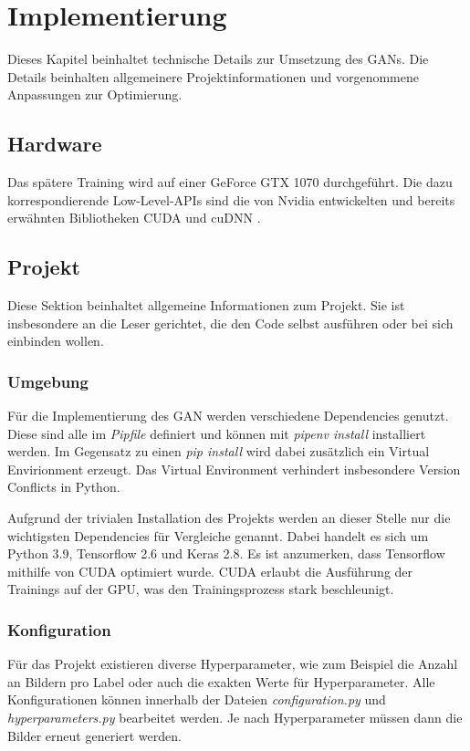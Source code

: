 
\chapter{Implementierung}
Dieses Kapitel beinhaltet technische Details zur Umsetzung des GANs.
Die Details beinhalten allgemeinere Projektinformationen und vorgenommene Anpassungen zur Optimierung.

\section{Hardware}
Das spätere Training wird auf einer GeForce GTX 1070 \cite{gtx-1070} durchgeführt.
Die dazu korrespondierende Low-Level-APIs sind die von Nvidia entwickelten und bereits erwähnten Bibliotheken CUDA \cite{cuda-doc} und cuDNN \cite{cudnn-doc}.  

\section{Projekt}
Diese Sektion beinhaltet allgemeine Informationen zum Projekt.
Sie ist insbesondere an die Leser gerichtet, die den Code selbst ausführen oder bei sich einbinden wollen.

\subsection{Umgebung}
Für die Implementierung des GAN werden verschiedene Dependencies genutzt.
Diese sind alle im \textit{Pipfile} definiert und können mit \textit{pipenv install} installiert werden.
Im Gegensatz zu einen \textit{pip install} wird dabei zusätzlich ein Virtual Envirionment erzeugt.
Das Virtual Environment verhindert insbesondere Version Conflicts in Python.
\newline

Aufgrund der trivialen Installation des Projekts werden an dieser Stelle nur die wichtigsten Dependencies für Vergleiche genannt.
Dabei handelt es sich um Python 3.9, Tensorflow 2.6 und Keras 2.8.
Es ist anzumerken, dass Tensorflow mithilfe von CUDA optimiert wurde.
CUDA erlaubt die Ausführung der Trainings auf der GPU, was den Trainingsprozess stark beschleunigt.

\subsection{Konfiguration}
\label{chapter:configuration-hyperparams}
Für das Projekt existieren diverse Hyperparameter, wie zum Beispiel die Anzahl an Bildern pro Label oder auch die exakten Werte für Hyperparameter.
Alle Konfigurationen können innerhalb der Dateien \textit{configuration.py} und \textit{hyperparameters.py}  bearbeitet werden.
Je nach Hyperparameter müssen dann die Bilder erneut generiert werden.

